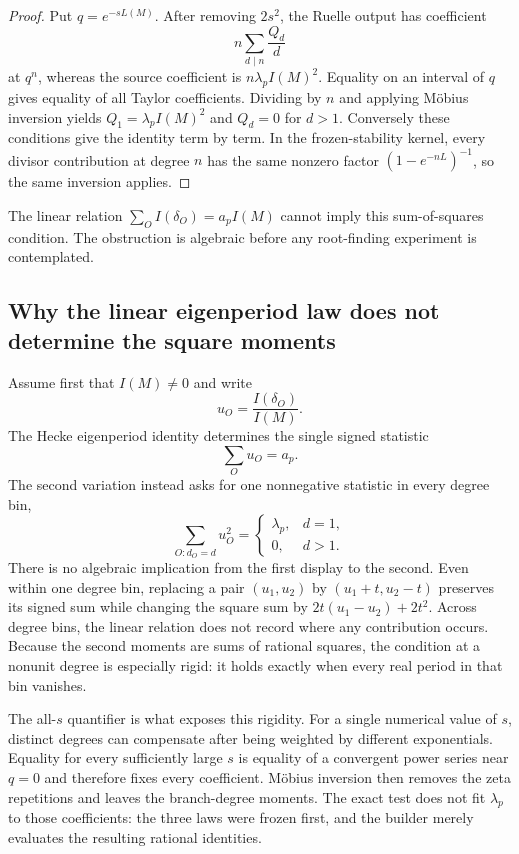\documentclass[11pt]{article}
\theoremstyle{definition}
\theoremstyle{remark}
\begin{document}
\begin{proof}
Put $q=e^{-sL(M)}$. After removing $2s^2$, the Ruelle output has coefficient
\[
n\sum_{d\mid n}\frac{Q_d}{d}
\]
at $q^n$, whereas the source coefficient is $n\lambda_pI(M)^2$. Equality on an interval of $q$ gives equality of all Taylor coefficients. Dividing by $n$ and applying M\"obius inversion yields $Q_1=\lambda_pI(M)^2$ and $Q_d=0$ for $d>1$. Conversely these conditions give the identity term by term. In the frozen-stability kernel, every divisor contribution at degree $n$ has the same nonzero factor $(1-e^{-nL})^{-1}$, so the same inversion applies.
\end{proof}

The linear relation $\sum_OI(\delta_O)=a_pI(M)$ cannot imply this sum-of-squares condition. The obstruction is algebraic before any root-finding experiment is contemplated.

\subsection{Why the linear eigenperiod law does not determine the square moments}

Assume first that $I(M)\neq0$ and write
\[
u_O=\frac{I(\delta_O)}{I(M)}.
\]
The Hecke eigenperiod identity determines the single signed statistic
\[
\sum_Ou_O=a_p.
\]
The second variation instead asks for one nonnegative statistic in every degree bin,
\[
\sum_{O:d_O=d}u_O^2=
\begin{cases}
\lambda_p,&d=1,\\
0,&d>1.
\end{cases}
\]
There is no algebraic implication from the first display to the second. Even within one degree bin, replacing a pair $(u_1,u_2)$ by $(u_1+t,u_2-t)$ preserves its signed sum while changing the square sum by $2t(u_1-u_2)+2t^2$. Across degree bins, the linear relation does not record where any contribution occurs. Because the second moments are sums of rational squares, the condition at a nonunit degree is especially rigid: it holds exactly when every real period in that bin vanishes.

The all-$s$ quantifier is what exposes this rigidity. For a single numerical value of $s$, distinct degrees can compensate after being weighted by different exponentials. Equality for every sufficiently large $s$ is equality of a convergent power series near $q=0$ and therefore fixes every coefficient. M\"obius inversion then removes the zeta repetitions and leaves the branch-degree moments. The exact test does not fit $\lambda_p$ to those coefficients: the three laws were frozen first, and the builder merely evaluates the resulting rational identities.
\end{document}
